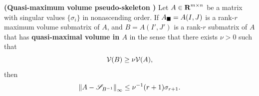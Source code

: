\documentclass{article}
\begin{document}
	\begin{thm} \textnormal{\bf(Quasi-maximum volume pseudo-skeleton \cite{olshevsky_2001})}
		\label{thm:quasi-maximum_volume_pseudo-skeleton}
		Let $A \in \textnormal{\bf R}^{m\times n}$ be a matrix with singular values $\{\sigma_i\}$ in nonascending order. If $A_\blacksquare = A(I,J)$ is a rank-$r$ maximum volume submatrix of $A$, and $B = A(I', J')$ is a rank-$r$ submatrix of $A$ that has \textbf{quasi-maximal volume in $A$} in the sense that there exists $\nu > 0$ such that
		\begin{equation}
			\mathcal{V}(B) \ge \nu \mathcal{V}(A),
		\end{equation}
		then
		\begin{equation}
			\left\lVert A - \mathscr{S}_{B^{-1}} \right\rVert_\infty \le \nu^{-1}(r+1)\sigma_{r+1}.
		\end{equation}
	\end{thm}
	
\end{document}
